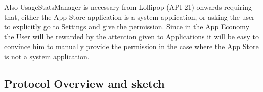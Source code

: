 Also UsageStatsManager is necessary from Lollipop (API 21) onwards requiring that, either the App Store application is a system application, or asking the user to explicitly go to Settings and give the permission. Since in the App Economy the User will be rewarded by the attention given to Applications it will be easy to convince him to manually provide the permission in the case where the App Store is not a system application.


\subsection{Protocol Overview and sketch}





%


